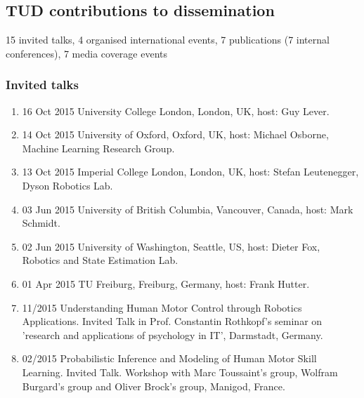 \subsection{TUD contributions to dissemination}

15 invited talks, 4 organised international events, 7 publications (7 internal conferences), 7 media coverage events


\subsubsection{Invited talks}

\begin{enumerate}

\item 16 Oct 2015 University College London, London, UK, host: Guy Lever.
\item 14 Oct 2015 University of Oxford, Oxford, UK, host: Michael Osborne, Machine Learning Research Group.
\item 13 Oct 2015 Imperial College London, London, UK, host: Stefan Leutenegger, Dyson Robotics Lab.
\item 03 Jun 2015 University of British Columbia, Vancouver, Canada, host: Mark Schmidt.
\item 02 Jun 2015 University of Washington, Seattle, US, host: Dieter Fox, Robotics and State Estimation Lab.
\item 01 Apr 2015 TU Freiburg, Freiburg, Germany, host: Frank Hutter.

\item 11/2015 Understanding Human Motor Control through Robotics Applications. Invited Talk in Prof. Constantin Rothkopf’s seminar on ’research and applications of psychology in IT’, Darmstadt, Germany.
\item 02/2015 Probabilistic Inference and Modeling of Human Motor Skill Learning. Invited Talk. Workshop with Marc Toussaint’s group, Wolfram Burgard’s group and Oliver Brock’s group, Manigod, France.



\end{enumerate}
